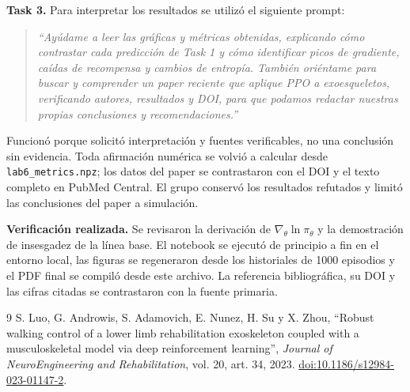 \documentclass[11pt,letterpaper]{article}
\newcommand{\lead}[1]{\textbf{#1}}
\begin{document}
\begin{respuesta}
\medskip
\lead{Task 3.} Para interpretar los resultados se utilizó el siguiente prompt:
\begin{quote}\itshape
``Ayúdame a leer las gráficas y métricas obtenidas, explicando cómo contrastar cada
predicción de Task 1 y cómo identificar picos de gradiente, caídas de recompensa y cambios
de entropía. También oriéntame para buscar y comprender un paper reciente que aplique PPO
a exoesqueletos, verificando autores, resultados y DOI, para que podamos redactar nuestras
propias conclusiones y recomendaciones.''
\end{quote}
Funcionó porque solicitó interpretación y fuentes verificables, no una conclusión sin
evidencia. Toda afirmación numérica se volvió a calcular desde
\texttt{lab6\_metrics.npz}; los datos del paper se contrastaron con el DOI y el texto
completo en PubMed Central. El grupo conservó los resultados refutados y limitó las
conclusiones del paper a simulación.

\medskip
\lead{Verificación realizada.} Se revisaron la derivación de
$\nabla_\theta \ln \pi_\theta$ y la demostración de insesgadez de la línea base. El
notebook se ejecutó de principio a fin en el entorno local, las figuras se regeneraron
desde los historiales de 1000 episodios y el PDF final se compiló desde este archivo. La
referencia bibliográfica, su DOI y las cifras citadas se contrastaron con la fuente
primaria.
\end{respuesta}

\begin{thebibliography}{9}
S. Luo, G. Androwis, S. Adamovich, E. Nunez, H. Su y X. Zhou,
\enquote{Robust walking control of a lower limb rehabilitation exoskeleton coupled with
a musculoskeletal model via deep reinforcement learning},
\emph{Journal of NeuroEngineering and Rehabilitation}, vol. 20, art. 34, 2023.
\href{https://doi.org/10.1186/s12984-023-01147-2}{doi:10.1186/s12984-023-01147-2}.
\end{thebibliography}
\end{document}

